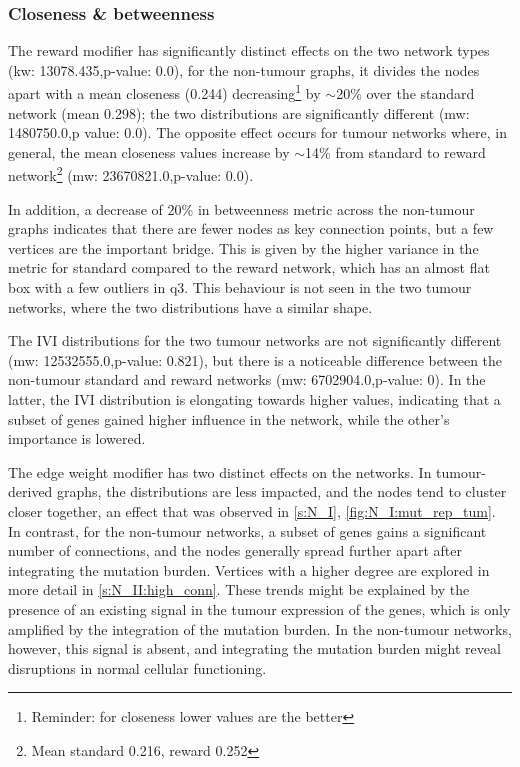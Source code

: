 \subsubsection*{Closeness \& betweenness}

The reward modifier has significantly distinct effects on the two network types (\acrshort{kw}: 13078.435,p-value: 0.0), for the non-tumour graphs, it divides the nodes apart with a mean closeness (0.244) decreasing\footnote{Reminder: for closeness lower values are the better} by $\sim$20\% over the standard network (mean 0.298); the two distributions are significantly different (\acrshort{mw}: 1480750.0,p value: 0.0). The opposite effect occurs for tumour networks where, in general, the mean closeness values increase by $\sim$14\% from standard to reward network\footnote{Mean standard 0.216, reward 0.252} (\acrshort{mw}: 23670821.0,p-value: 0.0).

In addition, a decrease of $20$\% in betweenness metric across the non-tumour graphs indicates that there are fewer nodes as key connection points, but a few vertices are the important bridge. This is given by the higher variance in the metric for standard compared to the reward network, which has an almost flat box with a few outliers in q3. This behaviour is not seen in the two tumour networks, where the two distributions have a similar shape.

The IVI distributions for the two tumour networks are not significantly different (\acrshort{mw}: 12532555.0,p-value: 0.821), but there is a noticeable difference between the non-tumour standard and reward networks (\acrshort{mw}: 6702904.0,p-value: 0). In the latter, the IVI distribution is elongating towards higher values, indicating that a subset of genes gained higher influence in the network, while the other's importance is lowered.


The edge weight modifier has two distinct effects on the networks. In tumour-derived graphs, the distributions are less impacted, and the nodes tend to cluster closer together, an effect that was observed in \cref{s:N_I}, \cref{fig:N_I:mut_rep_tum}. In contrast, for the non-tumour networks, a subset of genes gains a significant number of connections, and the nodes generally spread further apart after integrating the mutation burden. Vertices with a higher degree are explored in more detail in \cref{s:N_II:high_conn}. These trends might be explained by the presence of an existing signal in the tumour expression of the genes, which is only amplified by the integration of the mutation burden. In the non-tumour networks, however, this signal is absent, and integrating the mutation burden might reveal disruptions in normal cellular functioning.

